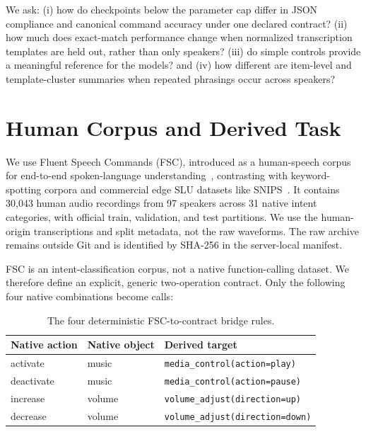 \documentclass[12pt]{article}
\begin{document}
We ask: (i) how do checkpoints below the parameter cap differ in JSON compliance and canonical command accuracy under one declared contract? (ii) how much does exact-match performance change when normalized transcription templates are held out, rather than only speakers? (iii) do simple controls provide a meaningful reference for the models? and (iv) how different are item-level and template-cluster summaries when repeated phrasings occur across speakers?

\section{Human Corpus and Derived Task}

We use Fluent Speech Commands (FSC), introduced as a human-speech corpus for end-to-end spoken-language understanding~\cite{lugosch2019}, contrasting with keyword-spotting corpora and commercial edge SLU datasets like SNIPS~\cite{coucke2018snips}. It contains 30,043 human audio recordings from 97 speakers across 31 native intent categories, with official train, validation, and test partitions. We use the human-origin transcriptions and split metadata, not the raw waveforms. The raw archive remains outside Git and is identified by SHA-256 in the server-local manifest.

FSC is an intent-classification corpus, not a native function-calling dataset. We therefore define an explicit, generic two-operation contract. Only the following four native combinations become calls:

\begin{table}[ht]
\centering
\caption{The four deterministic FSC-to-contract bridge rules.}
\label{tab:mapping}
\small
\begin{tabular}{lll}
\toprule
\textbf{Native action} & \textbf{Native object} & \textbf{Derived target} \\
\midrule
activate & music & \texttt{media\_control(action=play)} \\
deactivate & music & \texttt{media\_control(action=pause)} \\
increase & volume & \texttt{volume\_adjust(direction=up)} \\
decrease & volume & \texttt{volume\_adjust(direction=down)} \\
\bottomrule
\end{tabular}
\end{table}
\end{document}
